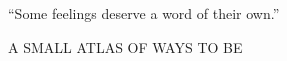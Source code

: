 \begin{ArtPage}
\centering
\vspace*{\fill}
{\Fontgaramonditalic\fontsize{22}{29}\selectfont\color{Poetic}%
  “Some feelings deserve a word of their own.”\par}
\vspace{1.2cm}
\ArtRule[.22\linewidth]
\vspace{1.2cm}
{\Fontgaramondbold\fontsize{6.5}{9}\selectfont\color{Muted}%
  A SMALL ATLAS OF WAYS TO BE\par}
\vspace*{\fill}
\end{ArtPage}
